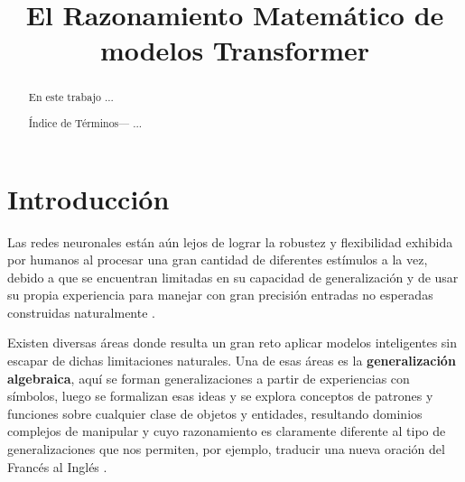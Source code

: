 \documentclass[conference]{IEEEtran}
\begin{document}
\title{\bf{El Razonamiento Matemático de modelos Transformer}}
\author{
\and
{}
\and
{}
}
\maketitle

\begin{abstract}

En este trabajo ...
\vspace{0.2cm}

\'Indice de T\'erminos— ...
\end{abstract}

\section{Introducci\'on}


Las redes neuronales están aún lejos de lograr la robustez y flexibilidad exhibida por humanos al procesar una gran cantidad de diferentes estímulos a la vez, debido a que se encuentran limitadas en su capacidad de generalización y de usar su propia experiencia para manejar con gran precisión entradas no esperadas construidas naturalmente \cite{b3}.

Existen diversas áreas donde resulta un gran reto aplicar modelos inteligentes sin escapar de dichas limitaciones naturales. Una de esas áreas es la \textbf{generalización algebraica}, aquí se forman generalizaciones a partir de experiencias con símbolos, luego se formalizan esas ideas y se explora conceptos de patrones y funciones sobre cualquier clase de objetos y entidades, resultando dominios complejos de manipular y cuyo razonamiento es claramente diferente al tipo de generalizaciones que nos permiten, por ejemplo, traducir una nueva oración del Francés al Inglés \cite{b5, b3}.
\end{document}
